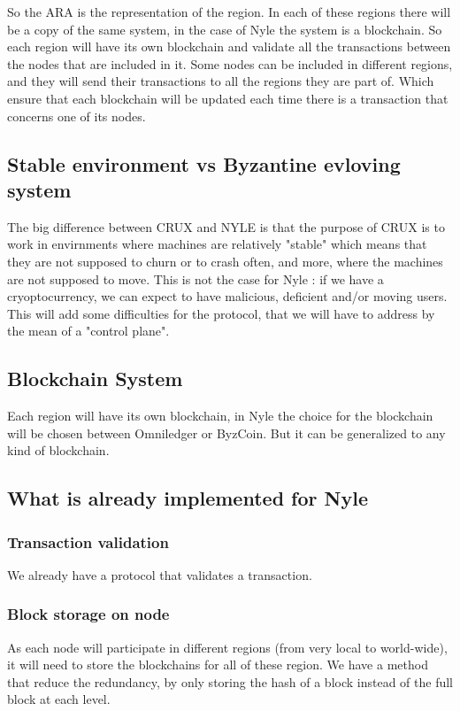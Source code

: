 So the ARA is the representation of the region. In each of these regions there will be a copy of the same system, in the case of Nyle the system is a blockchain. So each region will have its own blockchain and validate all the transactions between the nodes that are included in it. Some nodes can be included in different regions, and they will send their transactions to all the regions they are part of. Which ensure that each blockchain will be updated each time there is a transaction that concerns one of its nodes.

\subsection{Stable environment vs Byzantine evloving system}

The big difference between CRUX and NYLE is that the purpose of CRUX is to work in envirnments where machines are relatively "stable" which means that they are not supposed to churn or to crash often, and more, where the machines are not supposed to move. This is not the case for Nyle : if we have a cryoptocurrency, we can expect to have malicious, deficient and/or moving users. This will add some difficulties for the protocol, that we will have to address by the mean of a "control plane".  

\subsection{Blockchain System} \label{blockchain_subsection}

Each region will have its own blockchain, in Nyle the choice for the blockchain will be chosen between Omniledger or ByzCoin. But it can be generalized to any kind of blockchain. 





\subsection{What is already implemented for Nyle}
\subsubsection{Transaction validation}
We already have a protocol that validates a transaction.

\subsubsection{Block storage on node }
As each node will participate in different regions (from very local to world-wide), it will need to store the blockchains for all of these region. We have a method that reduce the redundancy, by only storing the hash of a block instead of the full block at each level. 

